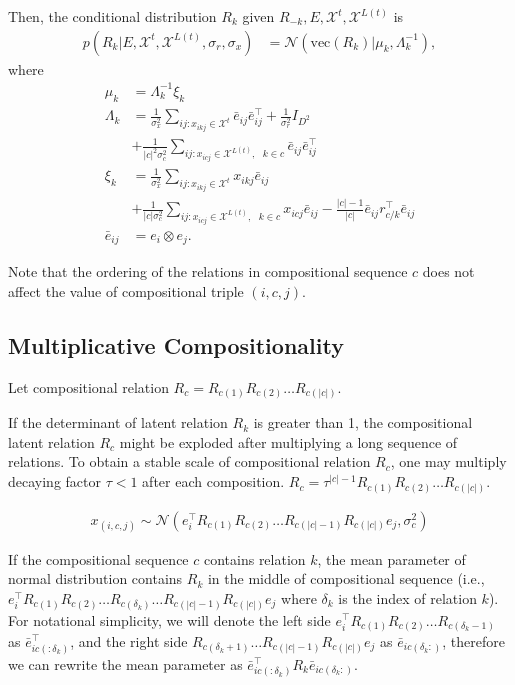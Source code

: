 \documentclass{article}
\begin{document}
Then, the conditional distribution $R_k$ given $R_{-k}, E, \mathcal{X}^{t}, \mathcal{X}^{L(t)}$ is
\begin{align}
\label{eqn:comp_cond_r}
p(R_k|E, \mathcal{X}^{t}, \mathcal{X}^{L(t)}, \sigma_r, \sigma_x)  &= \mathcal{N}(\text{vec}(R_k) | \mu_k, \Lambda_k^{-1}),
\end{align}
where
\begin{align*}
\mu_k &=\Lambda_k^{-1}\xi_k \\
\Lambda_k &= \frac{1}{\sigma_x^2} \sum_{ij:x_{ikj} \in \mathcal{X}^{t}} \bar{e}_{ij}\bar{e}_{ij}^\top + \frac{1}{\sigma_r^2} {I}_{D^2} \\
& +\frac{1}{|c|^2 \sigma_c^2} \sum_{ij:x_{icj} \in \mathcal{X}^{L(t)},\text{ }k \in c} \bar{e}_{ij} \bar{e}_{ij}^\top \\
\xi_k &=  \frac{1}{\sigma_x^2}\sum_{ij:x_{ikj} \in \mathcal{X}^{t}} x_{ikj} \bar{e}_{ij}\\
& +\frac{1}{|c| \sigma_c^2} \sum_{ij:x_{icj} \in \mathcal{X}^{L(t)},\text{ }k \in c} x_{icj} \bar{e}_{ij} - \frac{|c|-1}{|c|} \bar{e}_{ij} r_{c/k}^\top \bar{e}_{ij}\\
\bar{e}_{ij} &= e_{i} \otimes e_{j}.
\end{align*}

Note that the ordering of the relations in compositional sequence $c$ does not affect the value of compositional triple $(i, c, j)$.

\subsection{Multiplicative Compositionality}
Let compositional relation $R_c = R_{c(1)} R_{c(2)} \dots R_{c(|c|)}$.

If the determinant of latent relation $R_k$ is greater than 1, the compositional latent relation $R_c$ might be exploded after multiplying a long sequence of relations. To obtain a stable scale of compositional relation $R_c$, one may multiply decaying factor $\tau < 1$ after each composition. $R_c = \tau^{|c|-1} R_{c(1)} R_{c(2)} \dots R_{c(|c|)}$.

\begin{align}
x_{(i, c, j)} \sim \mathcal{N}(e_i^\top R_{c(1)}R_{c(2)} \dots R_{c(|c|-1)}R_{c(|c|)} e_j, \sigma_{c}^2)
\end{align}

If the compositional sequence $c$ contains relation $k$, the mean parameter of normal distribution contains $R_k$ in the middle of compositional sequence (i.e., $e_i^\top R_{c(1)}R_{c(2)} \dots R_{c(\delta_k)} \dots R_{c(|c|-1)}R_{c(|c|)} e_j$ where $\delta_k$ is the index of relation $k$). For notational simplicity, we will denote the left side $e_i^\top R_{c(1)}R_{c(2)} \dots R_{c(\delta_k -1)}$ as $\bar{e}_{ic(:\delta_k)}^\top$, and the right side $R_{c(\delta_k + 1)} \dots R_{c(|c|-1)}R_{c(|c|)} e_j$ as $\bar{e}_{ic(\delta_k:)}$, therefore we can rewrite the mean parameter as $\bar{e}_{ic(:\delta_k)}^\top R_{k} \bar{e}_{ic(\delta_k:)}$.
\end{document}

